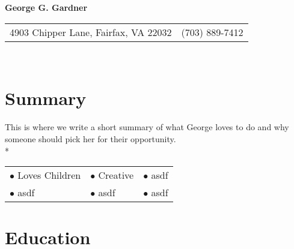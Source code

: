 \documentclass{article}
\begin{document}
\begin{center} 
\textbf{\LARGE George G. Gardner} \\
\begin{tabular}{@{} l l}
	4903 Chipper Lane, Fairfax, VA 22032 	& (703) 889-7412 \\
\end{tabular} \\
\end{center}
\section{Summary}
This is where we write a short summary of what George loves to do and why someone should pick her for their opportunity. \\*
\begin{minipage}{\textwidth}

\vspace{0.25cm}
\centering
\begin{tabular}{@{}p{5cm} p{5cm} p{5cm}}
	$\bullet$ Loves Children	& $\bullet$ Creative	& $\bullet$ asdf \\*
	$\bullet$ asdf 		& $\bullet$ asdf & $\bullet$ asdf \\*
\end{tabular}
\end{minipage}

\section{Education} 

\end{document}
